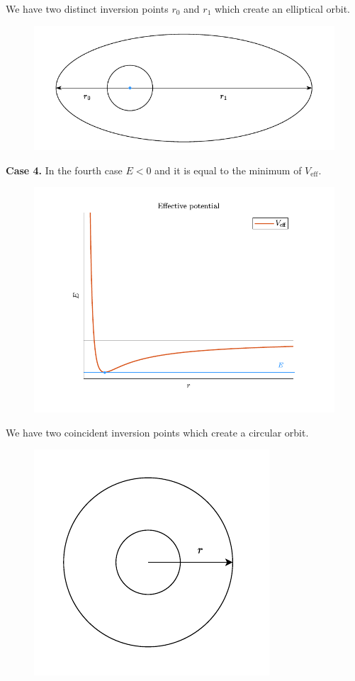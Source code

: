 We have two distinct inversion points $r_0$ and $r_1$ which create an elliptical orbit.
\begin{figure}[H]
  \centering
  \includegraphics[width=0.6\linewidth]{res/svg/elliptic_orbit._drawing.drawio}
\end{figure}
\textbf{Case 4.} In the fourth case $E<0$ and it is equal to the minimum of $V_{\text{eff}}$.
\begin{figure}[H]
  \centering
  \includegraphics[width=0.6\linewidth]{res/svg/circular_orbit.drawio}
\end{figure}
We have two coincident inversion points which create a circular orbit.
\begin{figure}[H]
  \centering
  \includegraphics[width=0.4\linewidth]{res/svg/circular_orbit_drawing.drawio}
\end{figure}
